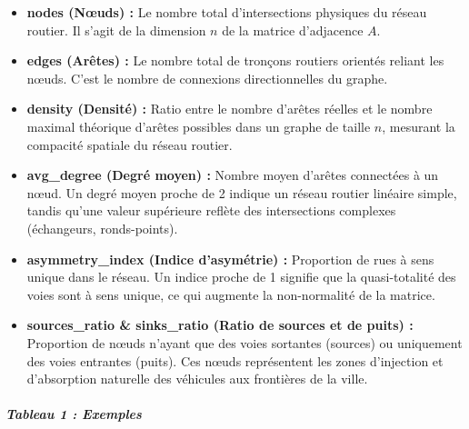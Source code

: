 \documentclass[10pt, a4paper]{article}
\begin{document}
\begin{itemize}
\item
  \textbf{nodes (Nœuds) :} Le nombre total d'intersections physiques du
  réseau routier. Il s'agit de la dimension \(n\) de la matrice
  d'adjacence \(A\).
\item
  \textbf{edges (Arêtes) :} Le nombre total de tronçons routiers
  orientés reliant les nœuds. C'est le nombre de connexions
  directionnelles du graphe.
\item
  \textbf{density (Densité) :} Ratio entre le nombre d'arêtes réelles et
  le nombre maximal théorique d'arêtes possibles dans un graphe de
  taille \(n\), mesurant la compacité spatiale du réseau routier.
\item
  \textbf{avg\_degree (Degré moyen) :} Nombre moyen d'arêtes connectées
  à un nœud. Un degré moyen proche de 2 indique un réseau routier
  linéaire simple, tandis qu'une valeur supérieure reflète des
  intersections complexes (échangeurs, ronds-points).
\item
  \textbf{asymmetry\_index (Indice d'asymétrie) :} Proportion de rues à
  sens unique dans le réseau. Un indice proche de 1 signifie que la
  quasi-totalité des voies sont à sens unique, ce qui augmente la
  non-normalité de la matrice.
\item
  \textbf{sources\_ratio \& sinks\_ratio (Ratio de sources et de puits)
  :} Proportion de nœuds n'ayant que des voies sortantes (sources) ou
  uniquement des voies entrantes (puits). Ces nœuds représentent les
  zones d'injection et d'absorption naturelle des véhicules aux
  frontières de la ville.
\end{itemize}

\subparagraph{Tableau 1 : Exemples}\label{tableau-1-exemples}
\end{document}
